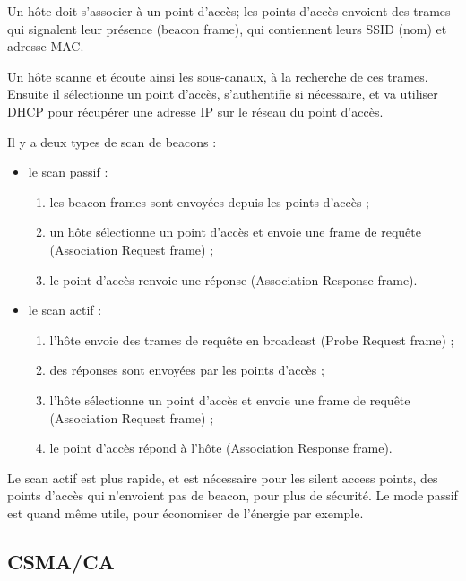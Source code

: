 		Un hôte doit s'associer à un point d'accès; les points d'accès envoient des trames qui signalent leur présence (beacon frame), qui contiennent leurs SSID (nom) et adresse MAC. 
		
		Un hôte scanne et écoute ainsi les sous-canaux, à la recherche de ces trames. Ensuite il sélectionne un point d'accès, s'authentifie si nécessaire, et va utiliser DHCP pour récupérer une adresse IP sur le réseau du point d'accès.
	
	
		Il y a deux types de scan de beacons :
	
		\begin{itemize}
			\item le scan passif :
			
			\begin{enumerate}
				\item les beacon frames sont envoyées depuis les points d'accès ;
				\item un hôte sélectionne un point d'accès et envoie une frame de requête (Association Request frame) ;
				\item le point d'accès renvoie une réponse (Association Response frame).
			\end{enumerate}
			
			\item le scan actif :
			
			\begin{enumerate}
				\item l'hôte envoie des trames de requête en broadcast (Probe Request frame) ;
				\item des réponses sont envoyées par les points d'accès ;
				\item l'hôte sélectionne un point d'accès et envoie une frame de requête (Association Request frame) ;
				\item le point d'accès répond à l'hôte (Association Response frame).
			\end{enumerate}
		\end{itemize}		
	
		 Le scan actif est plus rapide, et est nécessaire pour les silent access points, des points d'accès qui n'envoient pas de beacon, pour plus de sécurité. Le mode passif est quand même utile, pour économiser de l'énergie par exemple.
		 
		\subsection{CSMA/CA}
		
